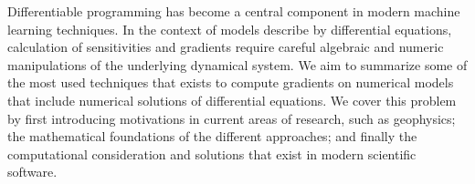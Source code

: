Differentiable programming has become a central component in modern machine learning techniques. 
In the context of models describe by differential equations, calculation of sensitivities and gradients require careful algebraic and numeric manipulations of the underlying dynamical system.
We aim to summarize some of the most used techniques that exists to compute gradients on numerical models that include numerical solutions of differential equations. 
We cover this problem by first introducing motivations in current areas of research, such as geophysics; the mathematical foundations of the different approaches; and finally the computational consideration and solutions that exist in modern scientific software. 
